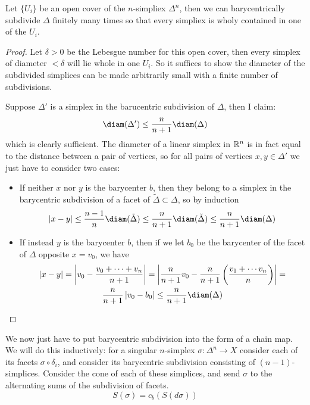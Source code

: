 \documentclass{article}
\begin{document}
\begin{lemma}
    Let $\{U_i\}$ be an open cover of the $n$-simpliex $\Delta^n$, then we can barycentrically subdivide $\Delta$ finitely many times so that every simpliex is wholy contained in one of the $U_i$.
    \begin{proof}
        Let $\delta>0$ be the Lebesgue number for this open cover, then every simplex of diameter $<\delta$ will lie whole in one $U_i$. So it suffices to show the diameter of the subdivided simplices can be made arbitrarily small with a finite number of subdivisions.

        Suppose $\Delta'$ is a simplex in the barucentric subdivision of $\Delta$, then I claim: \[
        \diam(\Delta')\leq \frac{n}{n+1}\diam(\Delta)
        \] which is clearly sufficient. The diameter of a linear simplex in $\mathbb{R}^n$ is in fact equal to the distance between a pair of vertices, so for all pairs of vertices $x,y\in\Delta'$ we just have to consider two cases:\begin{itemize}
            \item If neither $x$ nor $y$ is the barycenter $b$, then they belong to a simplex in the barycentric subdivision of a facet of $\tilde{\Delta}\subset \Delta$, so by induction \[
            \abs{x-y} \leq \frac{n-1}{n}\diam(\tilde{\Delta}) \leq \frac{n}{n+1}\diam(\tilde{\Delta})\leq \frac{n}{n+1}\diam(\Delta)
            \]
            \item If instead $y$ is the barycenter $b$, then if we let $b_0$ be the barycenter of the facet of $\Delta$ opposite $x=v_0$, we have \vspace{-12pt}\begin{gather*}
                \abs{x-y} = \abs{v_0 - \frac{v_0+\cdots+v_n}{n+1}}
                = \abs{\frac{n}{n+1}v_0 - \frac{n}{n+1}\pr{\frac{v_1+\cdots v_n}{n}}} = \\\frac{n}{n+1}\abs{v_0-b_0}\leq \frac{n}{n+1}\diam(\Delta)\qedhere
            \end{gather*}
        \end{itemize}
    \end{proof}
\end{lemma}
We now just have to put barycentric subdivision into the form of a chain map. We will do this inductively: for a singular $n$-simplex $\sigma:\Delta^n\rightarrow X$ consider each of its facets $\sigma\circ\delta_i$, and consider its barycentric subdivision consisting of $(n-1)$-simplices. Consider the cone of each of these simplices, and send $\sigma$ to the alternating sums of the subdivision of facets.\[
S(\sigma) = c_b(S(d \sigma))
\]
\end{document}
